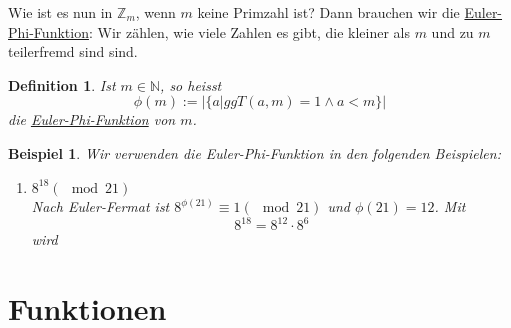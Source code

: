 \documentclass{report}
\newtheorem{mydef}{Definition}
\newtheorem{myexample}{Beispiel}
\begin{document}
Wie ist es nun in $\mathbb{Z}_m$, wenn $m$ keine Primzahl ist? Dann brauchen wir die \underline{Euler-Phi-Funktion}:
Wir zählen, wie viele Zahlen es gibt, die kleiner als $m$ und zu $m$ teilerfremd sind sind.
\begin{mydef}Ist $m \in \mathbb{N}$, so heisst
\begin{equation}\phi (m) := |\{a | ggT(a,m) = 1 \land a < m\}|\end{equation}
die \underline{Euler-Phi-Funktion} von $m$.\end{mydef}
\begin{myexample}Wir verwenden die Euler-Phi-Funktion in den folgenden Beispielen:\begin{enumerate}
\item $8^{18} (\mod{21})$\\
Nach Euler-Fermat ist $8^{\phi(21)} \equiv 1 (\mod{21})$ und $\phi(21) = 12$. Mit
\begin{equation}8^{18} = 8^{12} \cdot 8^6\end{equation}
wird
\end{enumerate}\end{myexample}
\chapter{Funktionen}
\end{document}
